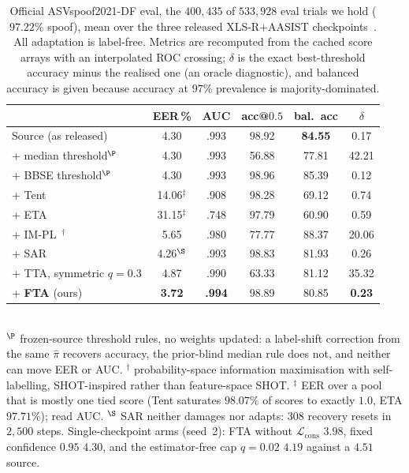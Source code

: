 \documentclass[10pt,letterpaper]{article}
\begin{document}
\begin{table}[t]
\centering
\caption{Official ASVspoof2021-DF eval, the $400{,}435$ of $533{,}928$ eval
trials we hold ($97.22\%$ spoof), mean over the three released XLS-R+AASIST
checkpoints~\cite{deepfensehf}. All adaptation is label-free. Metrics are
recomputed from the cached score arrays with an interpolated ROC crossing;
$\delta$ is the exact best-threshold accuracy minus the realised one (an oracle
diagnostic), and balanced accuracy is given because accuracy at $97\%$
prevalence is majority-dominated.}
\label{tab:protoa}
\small
\begin{tabular}{@{}lccccc@{}}
\toprule
& EER\,\% & AUC & acc@$0.5$ & bal.\ acc & $\delta$ \\
\midrule
Source (as released) & 4.30 & .993 & 98.92 & \textbf{84.55} & 0.17 \\
\;+ median threshold$^\P$ & 4.30 & .993 & 56.88 & 77.81 & 42.21 \\
\;+ BBSE threshold$^\P$ & 4.30 & .993 & 98.96 & 85.39 & 0.12 \\
\;+ Tent~\cite{tent} & 14.06$^\ddagger$ & .908 & 98.28 & 69.12 & 0.74 \\
\;+ ETA~\cite{eata} & 31.15$^\ddagger$ & .748 & 97.79 & 60.90 & 0.59 \\
\;+ IM-PL~\cite{shot}$^\dagger$ & 5.65 & .980 & 77.77 & 88.37 & 20.06 \\
\;+ SAR~\cite{sar} & 4.26$^\S$ & .993 & 98.83 & 81.93 & 0.26 \\
\;+ TTA, symmetric $q{=}0.3$ & 4.87 & .990 & 63.33 & 81.12 & 35.32 \\
\rowcolor{green!12}\;+ \textbf{FTA} (ours) & \textbf{3.72} & \textbf{.994} & 98.89 & 80.85 & \textbf{0.23} \\
\bottomrule
\end{tabular}
\\[2pt]
\small $^\P$ frozen-source threshold rules, no weights updated: a label-shift
correction from the same $\hat\pi$ recovers accuracy, the prior-blind median rule
does not, and neither can move EER or AUC. $^\dagger$ probability-space information maximisation with self-labelling,
SHOT-inspired rather than feature-space SHOT. $^\ddagger$ EER over a pool that is
mostly one tied score (Tent saturates $98.07\%$ of scores to exactly $1.0$, ETA
$97.71\%$); read AUC. $^\S$ SAR neither damages nor adapts: $308$ recovery resets
in $2{,}500$ steps. Single-checkpoint arms (seed~2): FTA without
$\mathcal L_{\mathrm{cons}}$ $3.98$, fixed confidence $0.95$ $4.30$, and the
estimator-free cap $q{=}0.02$ $4.19$ against a $4.51$ source.
\end{table}
\end{document}
